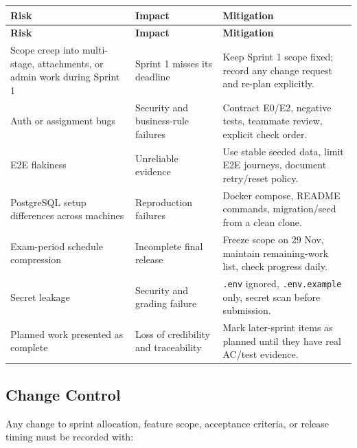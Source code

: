 \documentclass[11pt,a4paper]{article}
\begin{document}
\vspace{0.3em}
\begin{longtable}{|>{\RaggedRight}p{3.0cm}|>{\RaggedRight}p{6.8cm}|>{\RaggedRight}p{5.2cm}|}
\hline
\rowcolor{zenPale}\textbf{Risk} & \textbf{Impact} & \textbf{Mitigation} \\ \hline
\endfirsthead
\hline
\rowcolor{zenPale}\textbf{Risk} & \textbf{Impact} & \textbf{Mitigation} \\ \hline
\endhead
\hline
\endfoot
Scope creep into multi-stage, attachments, or admin work during Sprint 1 & Sprint 1 misses its deadline & Keep Sprint 1 scope fixed; record any change request and re-plan explicitly. \\ \hline
Auth or assignment bugs & Security and business-rule failures & Contract E0/E2, negative tests, teammate review, explicit check order. \\ \hline
E2E flakiness & Unreliable evidence & Use stable seeded data, limit E2E journeys, document retry/reset policy. \\ \hline
PostgreSQL setup differences across machines & Reproduction failures & Docker compose, README commands, migration/seed from a clean clone. \\ \hline
Exam-period schedule compression & Incomplete final release & Freeze scope on 29 Nov, maintain remaining-work list, check progress daily. \\ \hline
Secret leakage & Security and grading failure & \texttt{.\allowbreak env} ignored, \texttt{.\allowbreak env.\allowbreak example} only, secret scan before submission. \\ \hline
Planned work presented as complete & Loss of credibility and traceability & Mark later-sprint items as planned until they have real AC/test evidence. \\ \hline
\end{longtable}
\vspace{0.3em}


\subsection{Change Control}

Any change to sprint allocation, feature scope, acceptance criteria, or release timing must be recorded with:\\
\end{document}
